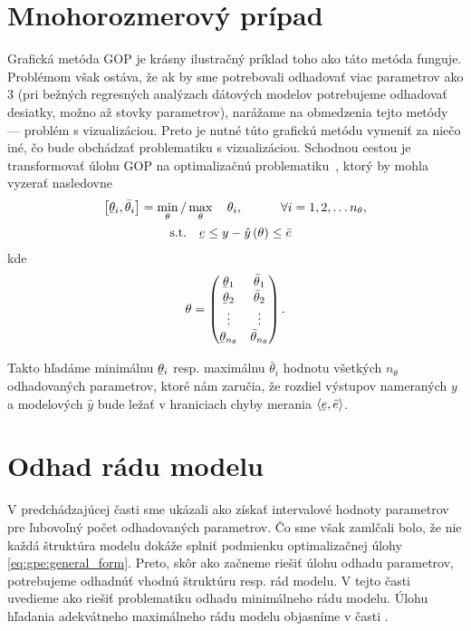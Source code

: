 \section{Mnohorozmerový prípad}
Grafická metóda GOP je krásny ilustračný príklad toho ako táto metóda funguje. Problémom však ostáva, že ak by sme potrebovali odhadovať viac parametrov ako 3 (pri bežných regresných analýzach dátových modelov potrebujeme odhadovať desiatky, možno až stovky parametrov), narážame na obmedzenia tejto metódy --- problém s vizualizáciou. Preto je nutné túto grafickú metódu vymeniť za niečo iné, čo bude obchádzať problematiku s vizualizáciou. Schodnou cestou je transformovať úlohu GOP na optimalizačnú problematiku~\cite{artzova:gpe_moving_hor:2019}, ktorý by mohla vyzerať nasledovne 
\begin{equation}
	\begin{split}
		\left[ \ubar{\theta}_i, \bar{\theta}_i \right] = \min_{\theta} / &\max_{\theta} \quad \theta_i, \quad\qquad \forall i = 1,2, \dots n_\theta, \\
		\text{s.t.}& \quad \ubar{e} \leq y - \hat{y}\left(\theta\right) \leq \bar{e}	
	\end{split}
	\label{eq:gpe:general_form}
\end{equation} 
kde 
\begin{equation*}
	\theta = 
	\begin{pmatrix}
		\ubar{\theta}_1 & \bar{\theta}_1 \\
		\ubar{\theta}_2 & \bar{\theta}_2 \\
		\vdots & \vdots \\
		\ubar{\theta}_{n_\theta} & \bar{\theta}_{n_\theta}	
	\end{pmatrix}.
\end{equation*}

Takto hľadáme minimálnu $ \ubar{\theta}_i $ resp. maximálnu $ \bar{\theta}_i $ hodnotu všetkých 
$ n_\theta $ odhadovaných  parametrov, ktoré nám zaručia, že rozdiel výstupov nameraných $ y $ a modelových $ \hat{y} $ bude ležať v hraniciach chyby merania $ \langle \ubar{e}, \bar{e} \rangle $.

\section{Odhad rádu modelu}
V predchádzajúcej časti sme ukázali ako získať intervalové hodnoty parametrov pre ľubovoľný počet odhadovaných parametrov. Čo sme však zamlčali bolo, že nie každá štruktúra modelu dokáže splniť podmienku optimalizačnej úlohy \eqref{eq:gpe:general_form}. Preto, skôr ako začneme riešiť úlohu odhadu parametrov, potrebujeme odhadnúť vhodnú štruktúru resp. rád modelu. V tejto časti uvedieme ako riešiť problematiku odhadu minimálneho rádu modelu. Úlohu hľadania adekvátneho maximálneho rádu modelu objasníme v časti .

